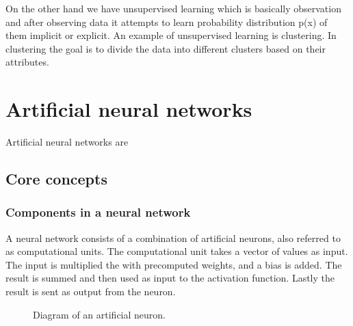 On the other hand we have unsupervised learning which is basically observation and after observing data it attempts to learn probability distribution p(x) of them implicit or explicit. An example of unsupervised learning is clustering. In clustering the goal is to divide the data into different clusters based on their attributes.



\section{Artificial neural networks}

Artificial neural networks are
% 
% 

\subsection{Core concepts}

\subsubsection{Components in a neural network}

A neural network consists of a combination of artificial neurons, also referred to as computational units. The computational unit takes a vector of values as input. The input is multiplied the with precomputed weights, and a bias is added. The result is summed and then used as input to the activation function. Lastly the result is sent as output from the neuron.

\begin{figure}
  \centering
    \caption{Diagram of an artificial neuron.}
\end{figure}

